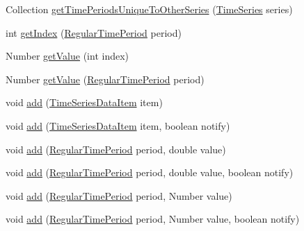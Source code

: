\begin{DoxyCompactItemize}
\item 
Collection \mbox{\hyperlink{classorg_1_1jfree_1_1data_1_1time_1_1_time_series_ab40303da4d1d5bbeb83721795ddceaa0}{get\+Time\+Periods\+Unique\+To\+Other\+Series}} (\mbox{\hyperlink{classorg_1_1jfree_1_1data_1_1time_1_1_time_series}{Time\+Series}} series)
\item 
int \mbox{\hyperlink{classorg_1_1jfree_1_1data_1_1time_1_1_time_series_ace0ed3b754ab547178a9dab7c0f6c6e3}{get\+Index}} (\mbox{\hyperlink{classorg_1_1jfree_1_1data_1_1time_1_1_regular_time_period}{Regular\+Time\+Period}} period)
\item 
Number \mbox{\hyperlink{classorg_1_1jfree_1_1data_1_1time_1_1_time_series_adee38412e801a3e779d144edd6bdf738}{get\+Value}} (int index)
\item 
Number \mbox{\hyperlink{classorg_1_1jfree_1_1data_1_1time_1_1_time_series_a5be1cb0fb4c9ca7d8efff148e6450436}{get\+Value}} (\mbox{\hyperlink{classorg_1_1jfree_1_1data_1_1time_1_1_regular_time_period}{Regular\+Time\+Period}} period)
\item 
void \mbox{\hyperlink{classorg_1_1jfree_1_1data_1_1time_1_1_time_series_af8f883a1ddb3348dd0078522630db91b}{add}} (\mbox{\hyperlink{classorg_1_1jfree_1_1data_1_1time_1_1_time_series_data_item}{Time\+Series\+Data\+Item}} item)
\item 
void \mbox{\hyperlink{classorg_1_1jfree_1_1data_1_1time_1_1_time_series_acd1766ebcf16f5f76384b17406ee0766}{add}} (\mbox{\hyperlink{classorg_1_1jfree_1_1data_1_1time_1_1_time_series_data_item}{Time\+Series\+Data\+Item}} item, boolean notify)
\item 
void \mbox{\hyperlink{classorg_1_1jfree_1_1data_1_1time_1_1_time_series_a95116fd1b2467c94b3928dda5f70c612}{add}} (\mbox{\hyperlink{classorg_1_1jfree_1_1data_1_1time_1_1_regular_time_period}{Regular\+Time\+Period}} period, double value)
\item 
void \mbox{\hyperlink{classorg_1_1jfree_1_1data_1_1time_1_1_time_series_a0ab959354d8fae9668f1808beef2b2d5}{add}} (\mbox{\hyperlink{classorg_1_1jfree_1_1data_1_1time_1_1_regular_time_period}{Regular\+Time\+Period}} period, double value, boolean notify)
\item 
void \mbox{\hyperlink{classorg_1_1jfree_1_1data_1_1time_1_1_time_series_a04451bbff4efcf3b867f85beabbdeb22}{add}} (\mbox{\hyperlink{classorg_1_1jfree_1_1data_1_1time_1_1_regular_time_period}{Regular\+Time\+Period}} period, Number value)
\item 
void \mbox{\hyperlink{classorg_1_1jfree_1_1data_1_1time_1_1_time_series_aecc131e71cf63ce54842e6cc19c4eaf5}{add}} (\mbox{\hyperlink{classorg_1_1jfree_1_1data_1_1time_1_1_regular_time_period}{Regular\+Time\+Period}} period, Number value, boolean notify)

\end{DoxyCompactItemize}
